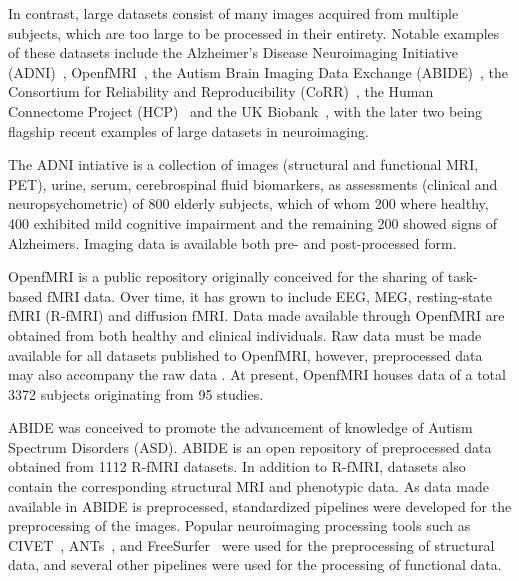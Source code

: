 \documentclass{report}
\newcommand{\tristan}[1]{\textcolor{red}{TG: #1}}
\begin{document}
            In contrast, large datasets consist of many images acquired from
            multiple subjects, which are too large to be processed in their
            entirety. Notable examples of these datasets include the 
            Alzheimer's Disease Neuroimaging Initiative 
            (ADNI)~\cite{doi:10.1002/jmri.21049}, 
            OpenfMRI~\cite{POLDRACK2017259}, 
            the Autism Brain Imaging Data Exchange 
            (ABIDE)~\cite{Di-Martino:2013aa}, the Consortium for
            Reliability and Reproducibility (CoRR)~\cite{Zuo:2014aa}, the Human 
            Connectome Project (HCP)~\cite{VANESSEN201362} and the UK 
            Biobank~\cite{Miller:2016aa}, with the later
            two being flagship recent examples of large datasets in 
            neuroimaging.

            The ADNI intiative is a collection of images (structural and 
            functional MRI, PET), urine,
            serum, cerebrospinal fluid biomarkers, as assessments (clinical and
            neuropsychometric) of 800 elderly subjects, which of whom 200 where
            healthy, 400 exhibited mild cognitive impairment and the remaining
            200 showed signs of Alzheimers. Imaging data is available both 
            pre- and post-processed form.

            OpenfMRI is a public repository originally conceived for the sharing
            of task-based fMRI data. Over time, it has grown to include EEG, MEG,
            resting-state fMRI (R-fMRI) and diffusion fMRI. Data made 
            available through
            OpenfMRI are obtained from both healthy and clinical individuals.
            Raw data must be made available for all datasets published to 
            OpenfMRI, however, preprocessed data may also accompany the raw data
            . At present, OpenfMRI houses data of a total 3372 subjects
            originating from 95 studies.

            ABIDE was conceived to promote the advancement of knowledge 
            of Autism Spectrum Disorders (ASD). %
            ABIDE is an open repository of 
            preprocessed data obtained from 1112 R-fMRI datasets.
            In addition to R-fMRI, datasets also contain the corresponding 
            structural MRI and phenotypic data. As data made available in ABIDE
            is preprocessed, standardized pipelines were developed for the 
            preprocessing of the images. Popular neuroimaging processing tools
            such as CIVET~\cite{citation-0}, ANTs~\cite{avants2009advanced}, 
            and FreeSurfer~\cite{FISCHL2012774} were used for the 
            preprocessing of structural data, and several other pipelines were
            used for the processing of functional data.
\end{document}
